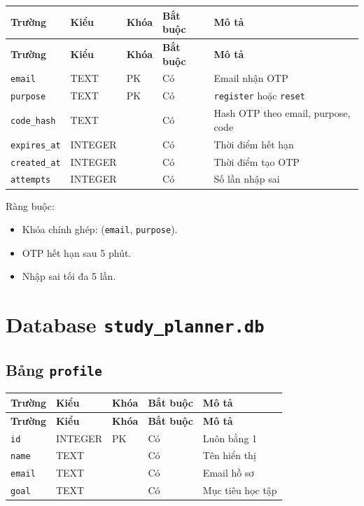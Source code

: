 \documentclass[12pt,a4paper]{report}
\begin{document}
\begin{longtable}{|>{\raggedright\arraybackslash}p{}|>{\raggedright\arraybackslash}p{}|>{\raggedright\arraybackslash}p{}|>{\raggedright\arraybackslash}p{}|>{\raggedright\arraybackslash}p{}|}
\hline
\textbf{Trường} & \textbf{Kiểu} & \textbf{Khóa} & \textbf{Bắt buộc} & \textbf{Mô tả} \\ \hline
\endfirsthead
\hline
\textbf{Trường} & \textbf{Kiểu} & \textbf{Khóa} & \textbf{Bắt buộc} & \textbf{Mô tả} \\ \hline
\endhead
\texttt{email} & TEXT & PK & Có & Email nhận OTP \\ \hline
\texttt{purpose} & TEXT & PK & Có & \texttt{register} hoặc \texttt{reset} \\ \hline
\texttt{code\_hash} & TEXT &  & Có & Hash OTP theo email, purpose, code \\ \hline
\texttt{expires\_at} & INTEGER &  & Có & Thời điểm hết hạn \\ \hline
\texttt{created\_at} & INTEGER &  & Có & Thời điểm tạo OTP \\ \hline
\texttt{attempts} & INTEGER &  & Có & Số lần nhập sai \\ \hline
\end{longtable}

Ràng buộc:

\begin{itemize}
\item Khóa chính ghép: (\texttt{email}, \texttt{purpose}).
\item OTP hết hạn sau 5 phút.
\item Nhập sai tối đa 5 lần.
\end{itemize}

\section{Database \texttt{study\_planner.db}}

\subsection{Bảng \texttt{profile}}

\begin{longtable}{|>{\raggedright\arraybackslash}p{}|>{\raggedright\arraybackslash}p{}|>{\raggedright\arraybackslash}p{}|>{\raggedright\arraybackslash}p{}|>{\raggedright\arraybackslash}p{}|}
\hline
\textbf{Trường} & \textbf{Kiểu} & \textbf{Khóa} & \textbf{Bắt buộc} & \textbf{Mô tả} \\ \hline
\endfirsthead
\hline
\textbf{Trường} & \textbf{Kiểu} & \textbf{Khóa} & \textbf{Bắt buộc} & \textbf{Mô tả} \\ \hline
\endhead
\texttt{id} & INTEGER & PK & Có & Luôn bằng 1 \\ \hline
\texttt{name} & TEXT &  & Có & Tên hiển thị \\ \hline
\texttt{email} & TEXT &  & Có & Email hồ sơ \\ \hline
\texttt{goal} & TEXT &  & Có & Mục tiêu học tập \\ \hline
\end{longtable}
\end{document}
